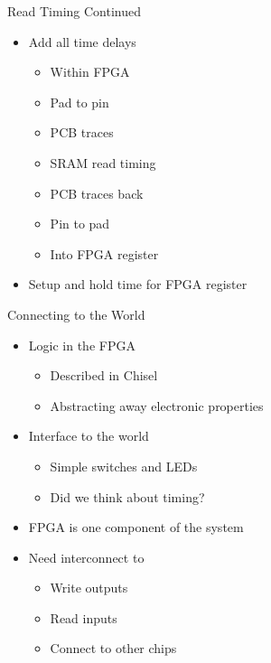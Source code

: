 \begin{frame}[fragile]{Read Timing Continued}
\begin{itemize}
\item Add all time delays
\begin{itemize}
\item Within FPGA
\item Pad to pin
\item PCB traces
\item SRAM read timing
\item PCB traces back
\item Pin to pad
\item Into FPGA register
\end{itemize}
\item Setup and hold time for FPGA register
\end{itemize}
\end{frame}

\begin{frame}[fragile]{Connecting to the World}
\begin{itemize}
\item Logic in the FPGA
\begin{itemize}
\item Described in Chisel
\item Abstracting away electronic properties
\end{itemize}
\item Interface to the world
\begin{itemize}
\item Simple switches and LEDs
\item Did we think about timing?
\end{itemize}
\item FPGA is one component of the system
\item Need interconnect to
\begin{itemize}
\item Write outputs
\item Read inputs
\item Connect to other chips
\end{itemize}
\end{itemize}
\end{frame}

